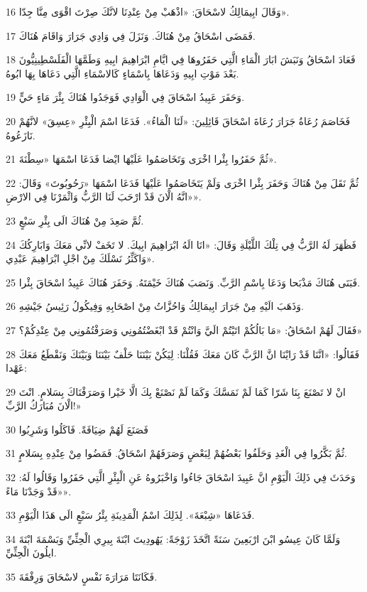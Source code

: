 \par 16 وَقَالَ ابِيمَالِكُ لاسْحَاقَ: «اذْهَبْ مِنْ عِنْدِنَا لانَّكَ صِرْتَ اقْوَى مِنَّا جِدّا».
\par 17 فَمَضَى اسْحَاقُ مِنْ هُنَاكَ. وَنَزَلَ فِي وَادِي جَرَارَ وَاقَامَ هُنَاكَ.
\par 18 فَعَادَ اسْحَاقُ وَنَبَشَ ابَارَ الْمَاءِ الَّتِي حَفَرُوهَا فِي ايَّامِ ابْرَاهِيمَ ابِيهِ وَطَمَّهَا الْفَلَسْطِينِيُّونَ بَعْدَ مَوْتِ ابِيهِ وَدَعَاهَا بِاسْمَاءٍ كَالاسْمَاءِ الَّتِي دَعَاهَا بِهَا ابُوهُ.
\par 19 وَحَفَرَ عَبِيدُ اسْحَاقَ فِي الْوَادِي فَوَجَدُوا هُنَاكَ بِئْرَ مَاءٍ حَيٍّ.
\par 20 فَخَاصَمَ رُعَاةُ جَرَارَ رُعَاةَ اسْحَاقَ قَائِلِينَ: «لَنَا الْمَاءُ». فَدَعَا اسْمَ الْبِئْرِ «عِسِقَ» لانَّهُمْ نَازَعُوهُ.
\par 21 ثُمَّ حَفَرُوا بِئْرا اخْرَى وَتَخَاصَمُوا عَلَيْهَا ايْضا فَدَعَا اسْمَهَا «سِطْنَةَ».
\par 22 ثُمَّ نَقَلَ مِنْ هُنَاكَ وَحَفَرَ بِئْرا اخْرَى وَلَمْ يَتَخَاصَمُوا عَلَيْهَا فَدَعَا اسْمَهَا «رَحُوبُوتَ» وَقَالَ: «انَّهُ الْانَ قَدْ ارْحَبَ لَنَا الرَّبُّ وَاثْمَرْنَا فِي الارْضِ».
\par 23 ثُمَّ صَعِدَ مِنْ هُنَاكَ الَى بِئْرِ سَبْعٍ.
\par 24 فَظَهَرَ لَهُ الرَّبُّ فِي تِلْكَ اللَّيْلَةِ وَقَالَ: «انَا الَهُ ابْرَاهِيمَ ابِيكَ. لا تَخَفْ لانِّي مَعَكَ وَابَارِكُكَ وَاكَثِّرُ نَسْلَكَ مِنْ اجْلِ ابْرَاهِيمَ عَبْدِي».
\par 25 فَبَنَى هُنَاكَ مَذْبَحا وَدَعَا بِاسْمِ الرَّبِّ. وَنَصَبَ هُنَاكَ خَيْمَتَهُ. وَحَفَرَ هُنَاكَ عَبِيدُ اسْحَاقَ بِئْرا.
\par 26 وَذَهَبَ الَيْهِ مِنْ جَرَارَ ابِيمَالِكُ وَاحُزَّاتُ مِنْ اصْحَابِهِ وَفِيكُولُ رَئِيسُ جَيْشِهِ.
\par 27 فَقَالَ لَهُمْ اسْحَاقُ: «مَا بَالُكُمْ اتَيْتُمْ الَيَّ وَانْتُمْ قَدْ ابْغَضْتُمُونِي وَصَرَفْتُمُونِي مِنْ عِنْدِكُمْ؟»
\par 28 فَقَالُوا: «انَّنَا قَدْ رَايْنَا انَّ الرَّبَّ كَانَ مَعَكَ فَقُلْنَا: لِيَكُنْ بَيْنَنَا حَلْفٌ بَيْنَنَا وَبَيْنَكَ وَنَقْطَعُ مَعَكَ عَهْدا:
\par 29 انْ لا تَصْنَعَ بِنَا شَرّا كَمَا لَمْ نَمَسَّكَ وَكَمَا لَمْ نَصْنَعْ بِكَ الَّا خَيْرا وَصَرَفْنَاكَ بِسَلامٍ. انْتَ الْانَ مُبَارَكُ الرَّبِّ!»
\par 30 فَصَنَعَ لَهُمْ ضِيَافَةً. فَاكَلُوا وَشَرِبُوا
\par 31 ثُمَّ بَكَّرُوا فِي الْغَدِ وَحَلَفُوا بَعْضُهُمْ لِبَعْضٍ وَصَرَفَهُمْ اسْحَاقُ. فَمَضُوا مِنْ عِنْدِهِ بِسَلامٍ.
\par 32 وَحَدَثَ فِي ذَلِكَ الْيَوْمِ انَّ عَبِيدَ اسْحَاقَ جَاءُوا وَاخْبَرُوهُ عَنِ الْبِئْرِ الَّتِي حَفَرُوا وَقَالُوا لَهُ: «قَدْ وَجَدْنَا مَاءً».
\par 33 فَدَعَاهَا «شِبْعَةَ». لِذَلِكَ اسْمُ الْمَدِينَةِ بِئْرُ سَبْعٍ الَى هَذَا الْيَوْمِ.
\par 34 وَلَمَّا كَانَ عِيسُو ابْنَ ارْبَعِينَ سَنَةً اتَّخَذَ زَوْجَةً: يَهُودِيتَ ابْنَةَ بِيرِي الْحِثِّيِّ وَبَسْمَةَ ابْنَةَ ايلُونَ الْحِثِّيِّ.
\par 35 فَكَانَتَا مَرَارَةَ نَفْسٍ لاسْحَاقَ وَرِفْقَةَ.

